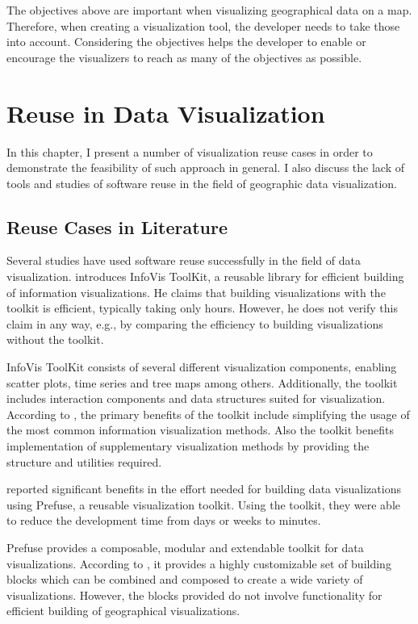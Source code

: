 The objectives above are important when visualizing geographical data on a map. Therefore, when creating a visualization tool, the developer needs to take those into account. Considering the objectives helps the developer to enable or encourage the visualizers to reach as many of the objectives as possible.

\chapter{Reuse in Data Visualization}
\label{chapter:reuseinvisualization}

In this chapter, I present a number of visualization reuse cases in order to demonstrate the feasibility of such approach in general. I also discuss the lack of tools and studies of software reuse in the field of geographic data visualization.

\section{Reuse Cases in Literature}

Several studies have used software reuse successfully in the field of data visualization. \citet{fekete_infovis_2004} introduces InfoVis ToolKit, a reusable library for efficient building of information visualizations. He claims that building visualizations with the toolkit is efficient, typically taking only hours. However, he does not verify this claim in any way, e.g., by comparing the efficiency to building visualizations without the toolkit.

InfoVis ToolKit consists of several different visualization components, enabling scatter plots, time series and tree maps among others. Additionally, the toolkit includes interaction components and data structures suited for visualization. According to \citeauthor{fekete_infovis_2004}, the primary benefits of the toolkit include simplifying the usage of the most common information visualization methods. Also the toolkit benefits implementation of supplementary visualization methods by providing the structure and utilities required.

\citet{heer_prefuse:_2005} reported significant benefits in the effort needed for building data visualizations using Prefuse, a reusable visualization toolkit. Using the toolkit, they were able to reduce the development time from days or weeks to minutes.

Prefuse provides a composable, modular and extendable toolkit for data visualizations. According to \citet{heer_prefuse:_2005}, it provides a highly customizable set of building blocks which can be combined and composed to create a wide variety of visualizations. However, the blocks provided do not involve functionality for efficient building of geographical visualizations.

